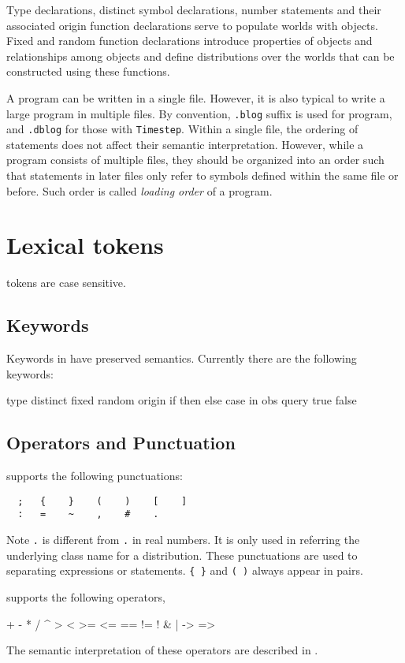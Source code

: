 \documentclass[12pt]{article}
\begin{document}
Type declarations, distinct symbol declarations, number statements and their associated origin function declarations serve to populate
worlds with objects. Fixed and random function declarations introduce properties of objects and relationships among objects
and define distributions over the worlds that can be constructed using these functions.

A \bl program can be written in a single file. However, it is also typical to write a large \bl program in multiple files. 
By convention, \texttt{.blog} suffix is used for \bl program, and \texttt{.dblog} for those with \verb|Timestep|. 
Within a single file, the ordering of statements does not affect their semantic interpretation. However, while a \bl program consists of multiple files, they should be organized into an order such that statements in later files only refer to symbols defined within the same file or before. Such order is called {\em loading order} of a \bl program. 

\section{Lexical tokens}
\bl tokens are case sensitive. 

\subsection{Keywords} \label{keyword-section}
Keywords in \bl have preserved semantics. Currently there are the following keywords:
\begin{blogcode}
  type    distinct    fixed    random    origin
  if      then        else     case      in
  obs     query       true     false
\end{blogcode}

\subsection{Operators and Punctuation}
\bl supports the following punctuations:
\begin{verbatim}
  ;   {    }    (    )    [    ]
  :   =    ~    ,    #    .
\end{verbatim}
Note \verb|.| is different from \verb|.| in real numbers. 
It is only used in referring the underlying class name for a distribution. 
These punctuations are used to separating expressions or statements. 
\verb|{ }| and \verb|( )| always appear in pairs. 

\bl supports the following operators,
\begin{blogcode}
  +    -    *    /    ^    %
  >    <    >=   <=   ==   !=
  !    &    |    ->   =>
\end{blogcode}
The semantic interpretation of these operators are described in .
\end{document}
